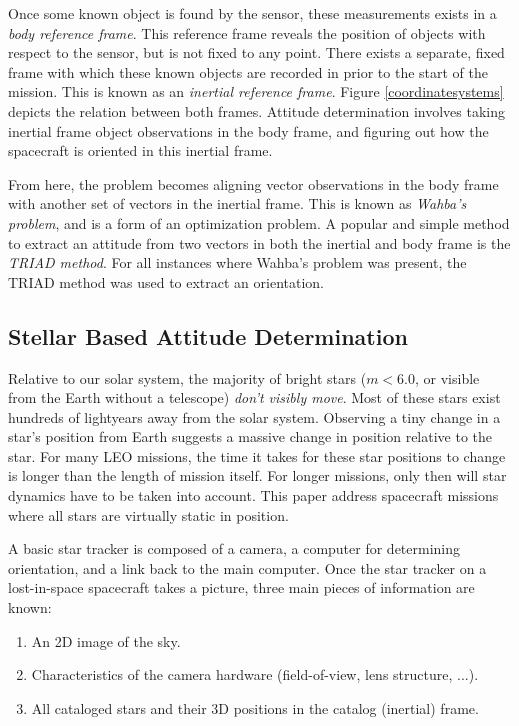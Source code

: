 Once some known object is found by the sensor, these measurements exists in a \textit{body reference frame}. This reference frame reveals the position of objects with respect to the sensor, but is not fixed to any point. There exists a separate, fixed frame with which these known objects are recorded in prior to the start of the mission. This is known as an \textit{inertial reference frame}. Figure \eqref{coordinatesystems} depicts the relation between both frames. Attitude determination involves taking inertial frame object observations in the body frame, and figuring out how the spacecraft is oriented in this inertial frame. 

From here, the problem becomes aligning vector observations in the body frame with another set of vectors in the inertial frame. This is known as \textit{Wahba's problem}, and is a form of an optimization problem. A popular and simple method to extract an attitude from two vectors in both the inertial and body frame is the \textit{TRIAD method}. For all instances where Wahba's problem was present, the TRIAD method was used to extract an orientation. 

\subsection{Stellar Based Attitude Determination}
Relative to our solar system, the majority of bright stars ($m < 6.0$, or visible from the Earth without a telescope) \textit{don't visibly move}. Most of these stars exist hundreds of lightyears away from the solar system. Observing a tiny change in a star's position from Earth suggests a massive change in position relative to the star. For many LEO missions, the time it takes for these star positions to change is longer than the length of mission itself. For longer missions, only then will star dynamics have to be taken into account. This paper address spacecraft missions where all stars are virtually static in position.

A basic star tracker is composed of a camera, a computer for determining orientation, and a link back to the main computer. Once the star tracker on a lost-in-space spacecraft takes a picture, three main pieces of information are known:
\begin{enumerate}
\item An 2D image of the sky. 
\item Characteristics of the camera hardware (field-of-view, lens structure, ...).
\item All cataloged stars and their 3D positions in the catalog (inertial) frame.
\end{enumerate}

